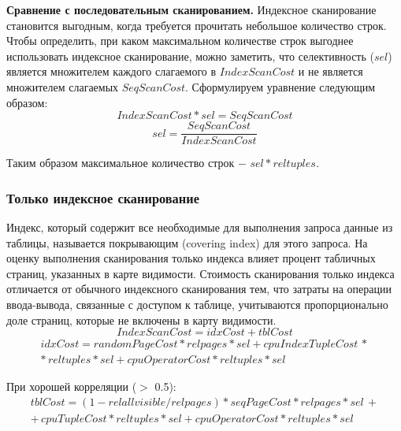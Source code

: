 \textbf{Сравнение с последовательным сканированием.} Индексное сканирование становится выгодным, когда требуется прочитать небольшое количество строк. Чтобы определить, при каком максимальном количестве строк выгоднее использовать индексное сканирование, можно заметить, что селективность ($sel$) является множителем каждого слагаемого в $IndexScanCost$ и не является множителем слагаемых $SeqScanCost$. Сформулируем уравнение следующим образом:
\begin{equation}
         IndexScanCost * sel = SeqScanCost 
\end{equation}
\begin{equation}
    sel = \frac{SeqScanCost}{IndexScanCost}
\end{equation}

Таким образом максимальное количество строк $-$ $sel * reltuples$.

\subsubsection{Только индексное сканирование}

Индекс, который содержит все необходимые для выполнения запроса данные из таблицы, называется покрывающим (covering index) для этого запроса. На оценку выполнения сканирования только индекса влияет процент табличных страниц, указанных в карте видимости. Стоимость сканирования только индекса отличается от обычного индексного сканирования тем, что затраты на операции ввода-вывода, связанные с доступом к таблице, учитываются пропорционально доле страниц, которые не включены в карту видимости.
\begin{equation}
    IndexScanCost = idxCost +tblCost
\end{equation}
\begin{equation}
    \begin{array}{c}
         idxCost = randomPageCost * relpages * sel + cpuIndexTupleCost \, * \\ 
         * \, reltuples * sel + cpuOperatorCost * reltuples * sel
    \end{array}
\end{equation}

При хорошей корреляции ($>$ 0.5):
\begin{equation}
    \begin{array}{c}
         tblCost = (1 - relallvisible/relpages) * seqPageCost * relpages * sel \,+ \\
         + \, cpuTupleCost * reltuples * sel + cpuOperatorCost * reltuples * sel
    \end{array}
\end{equation}


